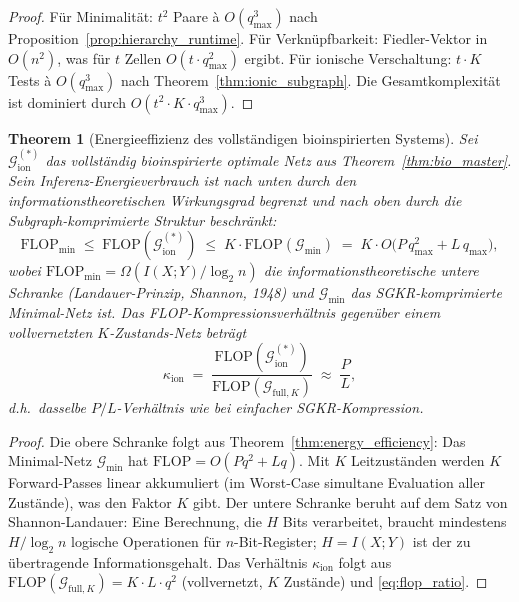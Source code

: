 \documentclass[12pt, a4paper, openany]{report}
\newtheorem{theorem}{Theorem}[chapter]
\newcommand{\calG}{\mathcal{G}}
\begin{document}
\begin{proof}
Für Minimalität: $t^2$ Paare à $O(q_{\max}^3)$ nach Proposition~\ref{prop:hierarchy_runtime}.
Für Verknüpfbarkeit: Fiedler-Vektor in $O(n^2)$, was für $t$ Zellen $O(t \cdot q_{\max}^2)$ ergibt.
Für ionische Verschaltung: $t \cdot K$ Tests à $O(q_{\max}^3)$ nach Theorem~\ref{thm:ionic_subgraph}.
Die Gesamtkomplexität ist dominiert durch $O(t^2 \cdot K \cdot q_{\max}^3)$.
\end{proof}

\begin{theorem}[Energieeffizienz des vollständigen bioinspirierten Systems]
\label{thm:bio_energy}
Sei $\calG_{\mathrm{ion}}^{(*)}$ das vollständig bioinspirierte optimale
Netz aus Theorem~\ref{thm:bio_master}.  Sein Inferenz-Energieverbrauch
ist nach unten durch den informationstheoretischen Wirkungsgrad begrenzt
und nach oben durch die Subgraph-komprimierte Struktur beschränkt:
\begin{equation}
  \label{eq:bio_energy_bound}
  \mathrm{FLOP}_{\min}
  \;\leq\;
  \mathrm{FLOP}(\calG_{\mathrm{ion}}^{(*)})
  \;\leq\;
  K \cdot\mathrm{FLOP}(\calG_{\min})
  \;=\;
  K \cdot O\!\bigl(P\,q_{\max}^2 + L\,q_{\max}\bigr),
\end{equation}
wobei $\mathrm{FLOP}_{\min} = \Omega(I(X;Y) / \log_2 n)$ die
informationstheoretische untere Schranke (Lan\-dauer-Prinzip, Shannon, 1948)
und $\calG_{\min}$ das SGKR-komprimierte Minimal-Netz ist.  Das
FLOP-Kompressions\-ver\-hältnis gegenüber einem vollvernetzten
$K$-Zustands-Netz beträgt
\begin{equation}
  \label{eq:bio_flop_ratio}
  \kappa_{\mathrm{ion}}
  \;=\;
  \frac{\mathrm{FLOP}(\calG_{\mathrm{ion}}^{(*)})}
       {\mathrm{FLOP}(\calG_{\mathrm{full}, K})}
  \;\approx\;
  \frac{P}{L},
\end{equation}
d.h.\ dasselbe $P/L$-Verhältnis wie bei einfacher SGKR-Kompression.
\end{theorem}

\begin{proof}
Die obere Schranke folgt aus Theorem~\ref{thm:energy_efficiency}: Das
Minimal-Netz $\calG_{\min}$ hat $\mathrm{FLOP} = O(Pq^2 + Lq)$.
Mit $K$ Leitzuständen werden $K$ Forward-Passes linear akkumuliert
(im Worst-Case simultane Evaluation aller Zustände), was den Faktor $K$ gibt.
Der untere Schranke beruht auf dem Satz von Shannon-Landauer:
Eine Berechnung, die $H$ Bits verarbeitet, braucht mindestens $H/\log_2 n$
logische Operationen für $n$-Bit-Register;
$H = I(X;Y)$ ist der zu übertragende Informationsgehalt.
Das Verhältnis $\kappa_{\mathrm{ion}}$ folgt aus $\mathrm{FLOP}(\calG_{\mathrm{full},K})
= K \cdot L \cdot q^2$ (vollvernetzt, $K$ Zustände) und \eqref{eq:flop_ratio}.
\end{proof}
\end{document}
